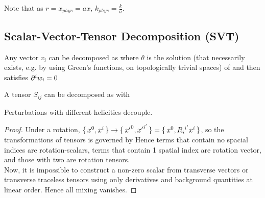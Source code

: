 \documentclass{article}
\begin{document}
Note that as $r = x_{phys} = a x$,  $k_{phys} = \frac{k}{a}$. 



\subsection{Scalar-Vector-Tensor Decomposition (SVT)}

\begin{definition}
Any vector $v_i$ can be decomposed as 
where $\theta$ is the solution (that necessarily exists, e.g. by using Green's functions, on topologically trivial spaces) of 
and then 
satisfies $\partial^i w_i = 0$
\end{definition}

\begin{definition}
A tensor $S_{ij}$ can be decomposed as 
with 
\end{definition}


\begin{theorem}
Perturbations with different helicities decouple.
\end{theorem}
\begin{proof}
Under a rotation, $\set{x^0,x^i} \to \set{{x^\prime}^0,{x^\prime}^{i^\prime}}=\set{x^0, R\indices{_i^{i^\prime}} x^i}$, so the transformations of tensors is governed by 
Hence terms that contain no spacial indices are rotation-scalars, terms that contain 1 spatial index are rotation vector, and those with two are rotation tensors. \\
Now, it is impossible to construct a non-zero scalar from transverse vectors or transverse traceless tensors using only derivatives and background quantities at linear order. Hence all mixing vanishes. 
\end{proof}
\end{document}
